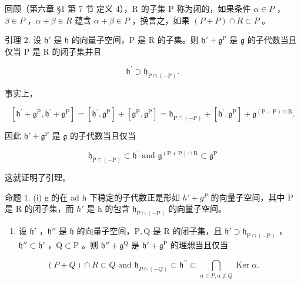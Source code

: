 回顾（第六章 §1 第 7 节 定义 4），R 的子集 P 称为闭的，如果条件 \(\alpha \in P\) ，\(\beta \in P\) ，\(\alpha + \beta \in R\) 蕴含 \(\alpha + \beta \in P\) ，换言之，如果 \((P + P) \cap R \subset P\) 。

引理 2. 设 \(\mathfrak{h}'\) 是 \(\mathfrak{h}\) 的向量子空间，\(\mathrm{P}\) 是 \(\mathrm{R}\) 的子集。则 \(\mathfrak{h}' + \mathfrak{g}^{\mathrm{P}}\) 是 \(\mathfrak{g}\) 的子代数当且仅当 \(\mathrm{P}\) 是 \(\mathrm{R}\) 的闭子集并且

\[
\mathfrak {h} ^ {\prime} \supset \mathfrak {h} _ {\mathrm{P} \cap (- \mathrm{P})}.
\]

事实上，

\[
[ \mathfrak {h} ^ {\prime} + \mathfrak {g} ^ {\mathrm{P}}, \mathfrak {h} ^ {\prime} + \mathfrak {g} ^ {\mathrm{P}} ] = [ \mathfrak {h} ^ {\prime}, \mathfrak {g} ^ {\mathrm{P}} ] + [ \mathfrak {g} ^ {\mathrm{P}}, \mathfrak {g} ^ {\mathrm{P}} ] = \mathfrak {h} _ {\mathrm{P} \cap (- \mathrm{P})} + [ \mathfrak {h} ^ {\prime}, \mathfrak {g} ^ {\mathrm{P}} ] + \mathfrak {g} ^ {(\mathrm{P} + \mathrm{P}) \cap \mathrm{R}}.
\]

因此 \(\mathfrak{h}' + \mathfrak{g}^{\mathrm{P}}\) 是 \(\mathfrak{g}\) 的子代数当且仅当

\[
\mathfrak {h} _ {\mathrm{P} \cap (- \mathrm{P})} \subset \mathfrak {h} ^ {\prime} \text { and } \mathfrak {g} ^ {(\mathrm{P} + \mathrm{P}) \cap \mathrm{R}} \subset \mathfrak {g} ^ {\mathrm{P}}
\]

这就证明了引理。

命题 1. (i) g 的在 ad h 下稳定的子代数正是形如 \(h' + g^{P}\) 的向量子空间，其中 P 是 R 的闭子集，而 \(h'\) 是 h 的包含 \(\mathfrak{h}_{\mathrm{P}\cap(-\mathrm{P})}\) 的向量子空间。

\begin{enumerate}
\def\labelenumi{(\roman{enumi})}
\setcounter{enumi}{1}
\tightlist
\item
  设 \(\mathfrak{h}'\) ，\(\mathfrak{h}''\) 是 \(\mathfrak{h}\) 的向量子空间，\(\mathrm{P},\mathrm{Q}\) 是 \(\mathrm{R}\) 的闭子集，且 \(\mathfrak{h}'\supset \mathfrak{h}_{\mathrm{P}\cap (-\mathrm{P})}\) ，\(\mathfrak{h}''\subset \mathfrak{h}'\) ，\(\mathrm{Q}\subset \mathrm{P}\) 。则 \(\mathfrak{h}'' + \mathfrak{g}^{\mathrm{Q}}\) 是 \(\mathfrak{h}' + \mathfrak{g}^{\mathrm{P}}\) 的理想当且仅当
\end{enumerate}

\[
(P + Q) \cap R \subset Q \text { and } \mathfrak {h} _ {P \cap (- Q)} \subset \mathfrak {h} ^ {\prime \prime} \subset \bigcap_ {\alpha \in P, \alpha \notin Q} \operatorname{Ker} \alpha .
\]

